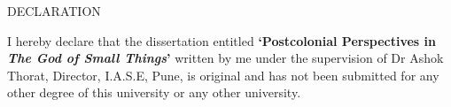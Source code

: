 \newpage
{}
\begin{center}
    \LARGE DECLARATION
\end{center}

I  hereby  declare  that  the  dissertation  entitled  \textbf{‘Postcolonial  Perspectives  in  \emph{The  God  of  Small  Things}’}  written  by  me  under  the  supervision  of  Dr  Ashok  Thorat,  Director,  I.A.S.E,  Pune,  is  original  and  has  not  been  submitted  for  any  other  degree  of  this  university  or  any  other  university.


\vspace{40pt}

\makeatletter
\signat{\empty}{\textbf{\@date}} \hfill {}
\makeatother